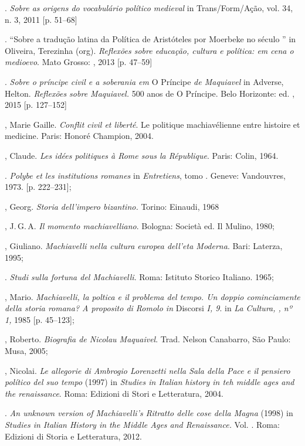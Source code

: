 \begin{bibliohedra}
\titidem. \emph{Sobre as origens do vocabulário político
medieval} in Trans/Form/Ação, vol. 34, n. 3, 2011 {[}p. 51--68{]}

\titidem. ``Sobre a tradução latina da Política de Aristóteles por Moerbeke no século '' in Oliveira, Terezinha (org). \emph{Reflexões sobre educação, cultura e política: em cena o medioevo}. Mato Grosso: , 2013 {[}p. 47--59{]}

\titidem. \emph{Sobre o príncipe civil e a soberania em} O
Príncipe \emph{de Maquiavel} in Adverse, Helton. \emph{Reflexões sobre
Maquiavel.} 500 anos de O Príncipe. Belo Horizonte: ed. , 2015 {[}p.
127--152{]}

, Marie Gaille. \emph{Conflit civil et liberté}. Le politique
machiavélienne entre histoire et medicine. Paris: Honoré Champion, 2004.

, Claude. \emph{Les idées politiques à Rome sous la République}.
Paris: Colin, 1964.

\titidem. \emph{Polybe et les institutions romanes} in
\emph{Entretiens}, tomo . Geneve: Vandouvres, 1973. {[}p. 222--231{]};

, Georg. \emph{Storia dell'impero bizantino.} Torino: Einaudi,
1968

, J.\,G.\,A. \emph{Il momento machiavelliano}. Bologna: Società ed.
Il Mulino, 1980;

, Giuliano. \emph{Machiavelli nella cultura europea dell'eta
Moderna}. Bari: Laterza, 1995;

\titidem. \emph{Studi sulla fortuna del Machiavelli}. Roma:
Istituto Storico Italiano. 1965;

, Mario. \emph{Machiavelli, la poltica e il problema del tempo. Un
doppio cominciamente della storia romana? A proposito di Romolo in}
Discorsi \emph{I, 9}. in \emph{La Cultura, , nº 1,} 1985 {[}p.
45--123{]};

, Roberto. \emph{Biografia de Nicolau Maquaivel}. Trad. Nelson
Canabarro, São Paulo: Musa, 2005;

, Nicolai. \emph{Le allegorie di Ambrogio Lorenzetti nella
Sala della Pace e il pensiero político del suo tempo} (1997) in
\emph{Studies in Italian history in teh middle ages and the
renaissance}. Roma: Edizioni di Stori e Letteratura, 2004.

\titidem. \emph{An unknown version of Machiavelli's Ritratto
delle cose della Magna} (1998) in \emph{Studies in Italian History in
the Middle Ages and Renaissance.} Vol. . Roma: Edizioni di Storia e
Letteratura, 2012.


\end{bibliohedra}
